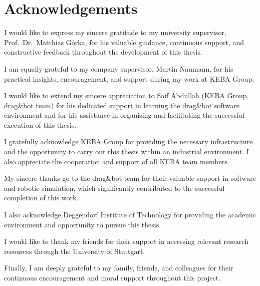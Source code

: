 \chapter*{Acknowledgements}

I would like to express my sincere gratitude to my university supervisor, Prof.\ Dr.\ Matthias G\'orka, for his valuable guidance, continuous support, and constructive feedback throughout the development of this thesis.

I am equally grateful to my company supervisor, Martin Naumann, for his practical insights, encouragement, and support during my work at KEBA Group.

I would like to extend my sincere appreciation to Saif Abdullah (KEBA Group, drag\&bot team) for his dedicated support in learning the drag\&bot software environment and for his assistance in organising and facilitating the successful execution of this thesis.

I gratefully acknowledge KEBA Group for providing the necessary infrastructure and the opportunity to carry out this thesis within an industrial environment. I also appreciate the cooperation and support of all KEBA team members.

My sincere thanks go to the drag\&bot team for their valuable support in software and robotic simulation, which significantly contributed to the successful completion of this work.

I also acknowledge Deggendorf Institute of Technology for providing the academic environment and opportunity to pursue this thesis.

I would like to thank my friends for their support in accessing relevant research resources through the University of Stuttgart.

Finally, I am deeply grateful to my family, friends, and colleagues for their continuous encouragement and moral support throughout this project.